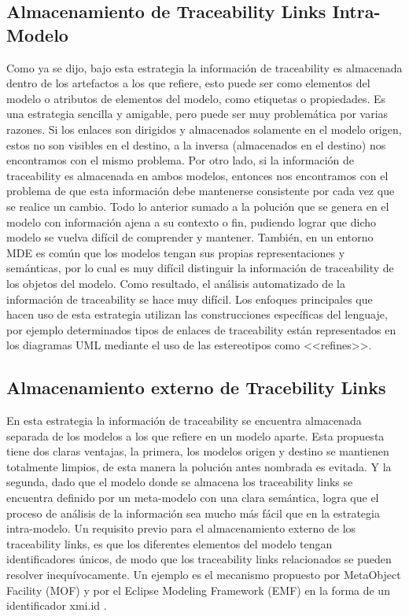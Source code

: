 \documentclass[a4paper,12pt,oneside]{book}
\begin{document}
\subsection{Almacenamiento de Traceability Links Intra-Modelo}

Como ya se dijo, bajo esta estrategia la información de traceability es almacenada dentro de los artefactos a los que refiere, esto puede ser como elementos del modelo o atributos de elementos del modelo, como etiquetas o propiedades. Es una estrategia sencilla y amigable, pero puede ser muy problemática por varias razones. Si los enlaces son dirigidos y almacenados solamente en el modelo origen, estos no son visibles en el destino, a la inversa (almacenados en el destino) nos encontramos con el mismo problema. Por otro lado, si la información de traceability es almacenada en ambos modelos, entonces nos encontramos con el problema de que esta información debe mantenerse consistente por cada vez que se realice un cambio. Todo lo anterior sumado a la polución que se genera en el modelo con información ajena a su contexto o fin, pudiendo lograr que dicho modelo se vuelva difícil de comprender y mantener. También, en un entorno MDE es común que los modelos tengan sus propias representaciones y semánticas, por lo cual es muy difícil distinguir la información de traceability de los objetos del modelo. Como resultado, el análisis automatizado de la información de traceability se hace muy difícil. Los enfoques principales que hacen uso de esta estrategia utilizan las construcciones específicas del lenguaje, por ejemplo determinados tipos de enlaces de traceability están representados en los diagramas UML mediante el uso de las estereotipos como <<refines>>.

\subsection{Almacenamiento externo de Tracebility Links}

En esta estrategia la información de traceability se encuentra almacenada separada de los modelos a los que refiere en un modelo aparte. Esta propuesta tiene dos claras ventajas, la primera, los modelos origen y destino se mantienen totalmente limpios, de esta manera la polución antes nombrada es evitada. Y la segunda, dado que el modelo donde se almacena los traceability links se encuentra definido por un meta-modelo con una clara semántica, logra que el proceso de análisis de la información sea mucho más fácil que en la estrategia intra-modelo.
Un requisito previo para el almacenamiento externo de los traceability links, es que los diferentes elementos del modelo tengan identificadores únicos, de modo que los traceability links relacionados se pueden resolver inequívocamente. Un ejemplo es el mecanismo propuesto por MetaObject Facility (MOF) y por el Eclipse Modeling Framework (EMF) en la forma de un identificador xmi.id .
\end{document}
